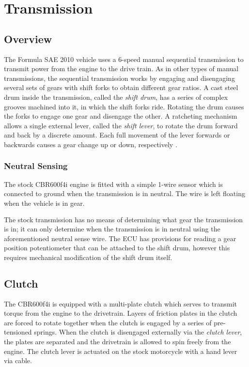 \section{Transmission}
\label{sec:background_transmission}

\subsection{Overview}

The Formula SAE 2010 vehicle uses a 6-speed manual sequential transmission to transmit power from the engine to the drive train. As in other types of manual transmissions, the sequential transmission works by engaging and disengaging several sets of gears with shift forks to obtain different gear ratios. A cast steel drum inside the transmission, called the \emph{shift drum}, has a series of complex grooves machined into it, in which the shift forks ride. Rotating the drum causes the forks to engage one gear and disengage the other. A ratcheting mechanism allows a single external lever, called the \emph{shift lever}, to rotate the drum forward and back by a discrete amount. Each full movement of the lever forwards or backwards causes a gear change up or down, respectively \cite{HowtoManualTransmission, cbr600}.

\subsubsection{Neutral Sensing}

The stock CBR600f4i engine is fitted with a simple 1-wire sensor which is connected to ground when the transmission is in neutral. The wire is left floating when the vehicle is in gear.

The stock transmission has no means of determining what gear the transmission is in; it can only determine when the transmission is in neutral using the aforementioned neutral sense wire. The ECU has provisions for reading a gear position potentiometer that can be attached to the shift drum, however this requires mechanical modification of the shift drum itself.

\subsection{Clutch}

The CBR600f4i is equipped with a multi-plate clutch which serves to transmit torque from the engine to the drivetrain. Layers of friction plates in the clutch are forced to rotate together when the clutch is engaged by a series of pre-tensioned springs. When the clutch is disengaged externally via the \emph{clutch lever}, the plates are separated and the drivetrain is allowed to spin freely from the engine. The clutch lever is actuated on the stock motorcycle with a hand lever via cable.

